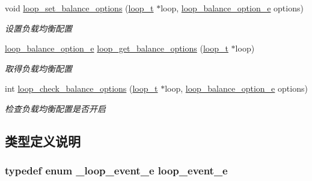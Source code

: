 \begin{DoxyCompactItemize}
void \hyperlink{a00052_a20964027b5a498c7f206d6a04568fa11_a20964027b5a498c7f206d6a04568fa11}{loop\+\_\+set\+\_\+balance\+\_\+options} (\hyperlink{a00044_a9c3ad1cd2de83e09f3a7b59fa82c94ee_a9c3ad1cd2de83e09f3a7b59fa82c94ee}{loop\+\_\+t} $\ast$loop, \hyperlink{a00044_a6c87150c8f33855c3427c783480fd8ba_a6c87150c8f33855c3427c783480fd8ba}{loop\+\_\+balance\+\_\+option\+\_\+e} options)
\begin{DoxyCompactList}\small\item\em 设置负载均衡配置 \end{DoxyCompactList}\item 
\hyperlink{a00044_a6c87150c8f33855c3427c783480fd8ba_a6c87150c8f33855c3427c783480fd8ba}{loop\+\_\+balance\+\_\+option\+\_\+e} \hyperlink{a00052_a5098c33527e18f4a0bd9bc1856ce17f1_a5098c33527e18f4a0bd9bc1856ce17f1}{loop\+\_\+get\+\_\+balance\+\_\+options} (\hyperlink{a00044_a9c3ad1cd2de83e09f3a7b59fa82c94ee_a9c3ad1cd2de83e09f3a7b59fa82c94ee}{loop\+\_\+t} $\ast$loop)
\begin{DoxyCompactList}\small\item\em 取得负载均衡配置 \end{DoxyCompactList}\item 
int \hyperlink{a00052_aff034d62b761d4ebad97180fb55a4582_aff034d62b761d4ebad97180fb55a4582}{loop\+\_\+check\+\_\+balance\+\_\+options} (\hyperlink{a00044_a9c3ad1cd2de83e09f3a7b59fa82c94ee_a9c3ad1cd2de83e09f3a7b59fa82c94ee}{loop\+\_\+t} $\ast$loop, \hyperlink{a00044_a6c87150c8f33855c3427c783480fd8ba_a6c87150c8f33855c3427c783480fd8ba}{loop\+\_\+balance\+\_\+option\+\_\+e} options)
\begin{DoxyCompactList}\small\item\em 检查负载均衡配置是否开启 \end{DoxyCompactList}\end{DoxyCompactItemize}


\subsection{类型定义说明}
\hypertarget{a00052_ab92fe4e788615cfd56530167651a8ff4_ab92fe4e788615cfd56530167651a8ff4}{}
\subsubsection[{loop\+\_\+event\+\_\+e}]{\setlength{\rightskip}{0pt plus 5cm}typedef enum {\bf \+\_\+loop\+\_\+event\+\_\+e}  {\bf loop\+\_\+event\+\_\+e}}\label{a00052_ab92fe4e788615cfd56530167651a8ff4_ab92fe4e788615cfd56530167651a8ff4}
\hypertarget{a00052_a1095ee772017ce29dcac0987c456709e_a1095ee772017ce29dcac0987c456709e}{}
